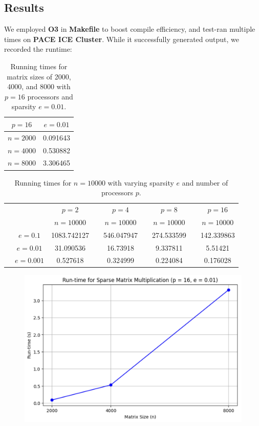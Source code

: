 \documentclass{article}
\begin{document}
\subsection{Results}
We employed \textbf{O3} in \textbf{Makefile} to boost compile efficiency, and test-ran multiple times on \textbf{PACE ICE Cluster}. While it successfully generated output, we recorded the runtime:
\begin{table}[H]
\centering
\begin{tabular}{cc}
\toprule
\( p = 16 \) & \( e = 0.01 \) \\
\midrule
\( n = 2000 \) & 0.091643 \\
\( n = 4000 \) & 0.530882 \\
\( n = 8000 \) & 3.306465 \\
\bottomrule
\end{tabular}
\caption{Running times for matrix sizes of 2000, 4000, and 8000 with \( p = 16 \) processors and sparsity \( e = 0.01 \).}
\label{tab:table1}
\end{table}
\begin{table}[ht]
\centering
\begin{tabular}{ccccccccc}
\toprule
& & \( p = 2 \) & & \( p = 4 \) & & \( p = 8 \) & & \( p = 16 \) \\
& & \( n = 10000 \) & & \( n = 10000 \) & & \( n = 10000 \) & & \( n = 10000 \) \\
\midrule
& \( e = 0.1 \) & 1083.742127 & & 546.047947 & & 274.533599 & & 142.339863 \\
& \( e = 0.01 \) & 31.090536 & & 16.73918 & & 9.337811 & & 5.51421 \\
& \( e = 0.001 \) & 0.527618 & & 0.324999 & & 0.224084 & & 0.176028 \\
\bottomrule
\end{tabular}
\caption{Running times for \( n = 10000 \) with varying sparsity \( e \) and number of processors \( p \).}
\label{tab:table2}
\end{table}


\begin{figure}[H]
    \centering
    \includegraphics[width=1\linewidth]{Screenshot 2024-04-21 at 21.34.44.png}
\end{figure}
\end{document}
